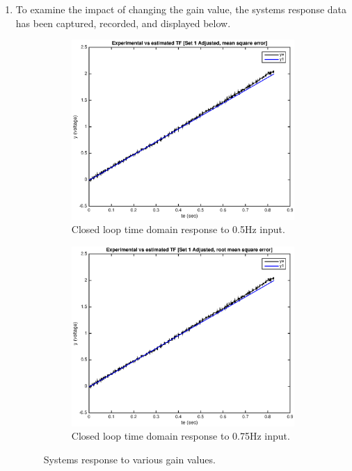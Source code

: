 \documentclass[11pt,a4paper]{article}
\begin{document}
\begin{enumerate}
	
	
	
	
	
	
	
	
	\pagebreak
	\item To examine the impact of changing the gain value, the systems response data has been captured, recorded, and displayed below.
	\begin{figure}[H]
	  \begin{subfigure}{0.5\textwidth}
	  \includegraphics[width=0.9\linewidth]{Matlab_Figures/y2_dataset1_ms.eps} 
	  \caption{Closed loop time domain response to 0.5Hz input.}
	  \label{fig:subim1}
	  \end{subfigure}
	  \begin{subfigure}{0.5\textwidth}
	  \includegraphics[width=0.9\linewidth]{Matlab_Figures/y2_dataset1_rms.eps}
	  \caption{Closed loop time domain response to 0.75Hz input.}
	  \label{fig:subim2}
	  \end{subfigure}
	  \caption{\label{fig:gainimpact}Systems response to various gain values.}
	\end{figure}
	

\end{enumerate}
\end{document}
